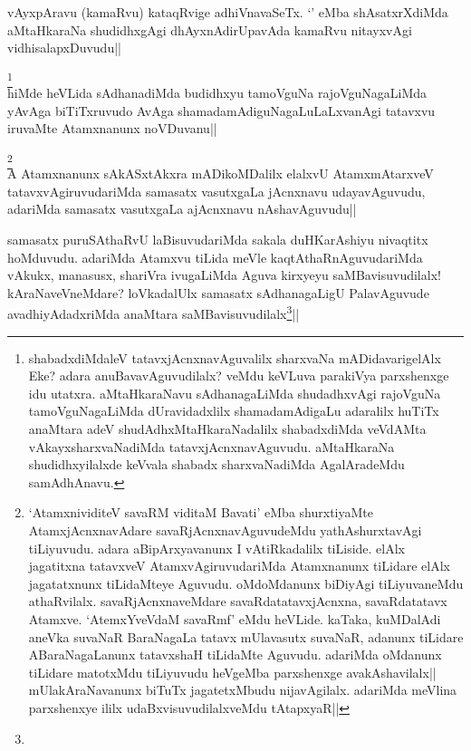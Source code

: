 \begin{artha} 
vAyxpAravu (kamaRvu) kataqRvige adhiVnavaSeTx. `\stext' eMba 
shAsatxrXdiMda aMtaHkaraNa shudidhxgAgi dhAyxnAdirUpavAda kamaRvu 
nitayxvAgi vidhisalapxDuvudu||
\end{artha}

\begin{artha} 
\footnote[3]{shabadxdiMdaleV tatavxjAcnxnavAguvalilx sharxvaNa 
mADidavarigelAlx Eke? adara anuBavavAguvudilalx? veMdu keVLuva 
parakiVya parxshenxge idu utatxra. aMtaHkaraNavu sAdhanagaLiMda 
shudadhxvAgi rajoVguNa tamoVguNagaLiMda dUravidadxlilx shamadamAdigaLu 
adaralilx huTiTx anaMtara adeV shudAdhxMtaHkaraNadalilx shabadxdiMda 
veVdAMta vAkayxsharxvaNadiMda tatavxjAcnxnavAguvudu. aMtaHkaraNa 
shudidhxyilalxde keVvala shabadx sharxvaNadiMda AgalAradeMdu 
samAdhAnavu.}\\
hiMde heVLida sAdhanadiMda budidhxyu tamoVguNa rajoVguNagaLiMda yAvAga 
biTiTxruvudo AvAga shamadamAdiguNagaLuLaLxvanAgi tatavxvu iruvaMte 
Atamxnanunx noVDuvanu||
\end{artha}

\begin{artha} 
\footnote[4]{`AtamxnividiteV savaRM viditaM Bavati' eMba shurxtiyaMte 
AtamxjAcnxnavAdare savaRjAcnxnavAguvudeMdu yathAshurxtavAgi 
tiLiyuvudu. adara aBipArxyavanunx I vAtiRkadalilx tiLiside. elAlx 
jagatitxna tatavxveV AtamxvAgiruvudariMda Atamxnanunx tiLidare elAlx 
jagatatxnunx tiLidaMteye Aguvudu. oMdoMdanunx biDiyAgi tiLiyuvaneMdu 
athaRvilalx. savaRjAcnxnaveMdare savaRdatatavxjAcnxna, savaRdatatavx 
Atamxve. `AtemxYveVdaM savaRmf' eMdu heVLide. kaTaka, kuMDalAdi aneVka 
suvaNaR BaraNagaLa tatavx mUlavasutx suvaNaR, adanunx tiLidare 
ABaraNagaLanunx tatavxshaH tiLidaMte Aguvudu. adariMda oMdanunx 
tiLidare matotxMdu tiLiyuvudu heVgeMba parxshenxge avakAshavilalx||\\
mUlakAraNavanunx biTuTx jagatetxMbudu nijavAgilalx. adariMda meVlina 
parxshenxye ililx udaBxvisuvudilalxveMdu tAtapxyaR||}\\
A Atamxnanunx sAkASxtAkxra mADikoMDalilx elalxvU AtamxmAtarxveV 
tatavxvAgiruvudariMda samasatx vasutxgaLa jAcnxnavu udayavAguvudu, 
adariMda samasatx vasutxgaLa ajAcnxnavu nAshavAguvudu|| 
\end{artha}


\begin{artha} 
samasatx puruSAthaRvU laBisuvudariMda sakala duHKarAshiyu nivaqtitx 
hoMduvudu. adariMda Atamxvu tiLida meVle kaqtAthaRnAguvudariMda 
vAkukx, manasusx, shariVra ivugaLiMda Aguva kirxyeyu 
saMBavisuvudilalx! kAraNaveVneMdare? loVkadalUlx samasatx 
sAdhanagaLigU PalavAguvude avadhiyAdadxriMda anaMtara 
saMBavisuvudilalx\footnote[1]{}||
\end{artha}

